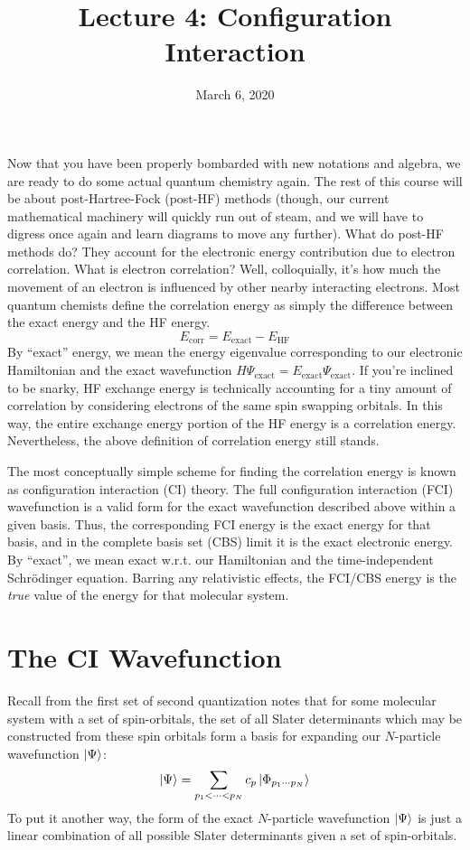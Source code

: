 \documentclass{article}
\title{Lecture 4: Configuration Interaction}
\date{March 6, 2020}
\begin{document}
\maketitle
\noindent
Now that you have been properly bombarded with new notations and algebra, we are ready to do some actual quantum chemistry again. 
The rest of this course will be about post-Hartree-Fock (post-HF) methods (though, our current mathematical machinery will quickly run out of steam, 
    and we will have to digress once again and learn diagrams to move any further).  
What do post-HF methods do? They account for the electronic energy contribution due to electron correlation. 
What is electron correlation? Well, colloquially, it's how much the movement of an electron is influenced by other nearby interacting electrons. 
Most quantum chemists define the correlation energy as simply the difference between the exact energy and the HF energy. 
\[E_{\mathrm{corr}}  = E_{\mathrm{exact}} - E_{\mathrm{HF}} \]
By ``exact'' energy, we mean the energy eigenvalue corresponding to our electronic Hamiltonian and the 
    exact wavefunction $\hat{H} \Psi_{\mathrm{exact}} = E_{\mathrm{exact}}  \Psi_{\mathrm{exact}} $. 
If you're inclined to be snarky, HF exchange energy is technically accounting 
    for a tiny amount of correlation by considering electrons of the same spin swapping orbitals. 
In this way, the entire exchange energy portion of the HF energy is a correlation energy. 
Nevertheless, the above definition of correlation energy still stands.

The most conceptually simple scheme for finding the correlation energy is known as configuration interaction (CI) theory.
The full configuration interaction (FCI) wavefunction is a valid form for the exact wavefunction described above within a given basis.
Thus, the corresponding FCI energy is the exact energy for that basis, and in the complete basis set (CBS) limit it is the exact electronic energy.
By ``exact'', we mean exact w.r.t. our Hamiltonian and the time-independent Schr{\"o}dinger equation.
Barring any relativistic effects, the FCI/CBS energy is the \textit{true} value of the energy for that molecular system.

\section{The CI Wavefunction} 
Recall from the first set of second quantization notes that for some molecular system with a set of spin-orbitals,
the set of all Slater determinants which may be constructed from these spin orbitals form a basis for expanding our $N$-particle wavefunction $\ket{\Psi}$:
\[ \ket{\Psi} = \sum_{p_1 < \cdots < p_N} c_p \ket{\Phi_{p_1 \cdots p_N}} \]
To put it another way, the form of the exact $N$-particle wavefunction $\ket{\Psi}$ is just a linear combination of all possible Slater determinants given a set of spin-orbitals.
\end{document}
